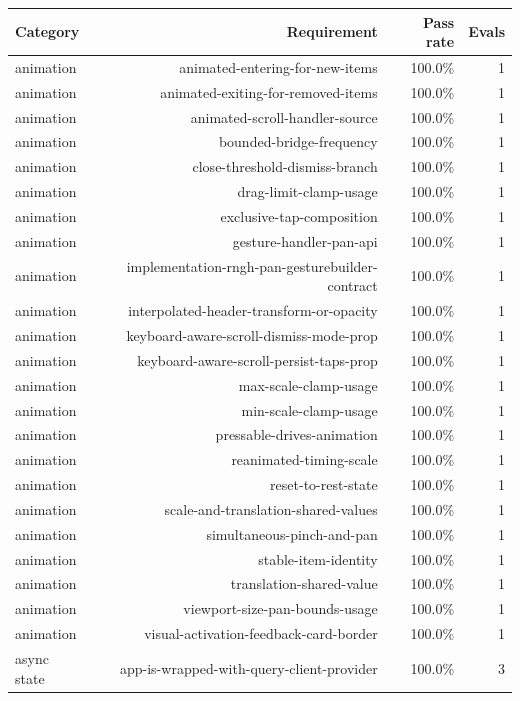 \begin{table}[htbp]
\centering
\begin{tabular}{lrrr}
\toprule
Category & Requirement & Pass rate & Evals \\
\midrule
animation & animated-entering-for-new-items & 100.0\% & 1 \\
animation & animated-exiting-for-removed-items & 100.0\% & 1 \\
animation & animated-scroll-handler-source & 100.0\% & 1 \\
animation & bounded-bridge-frequency & 100.0\% & 1 \\
animation & close-threshold-dismiss-branch & 100.0\% & 1 \\
animation & drag-limit-clamp-usage & 100.0\% & 1 \\
animation & exclusive-tap-composition & 100.0\% & 1 \\
animation & gesture-handler-pan-api & 100.0\% & 1 \\
animation & implementation-rngh-pan-gesturebuilder-contract & 100.0\% & 1 \\
animation & interpolated-header-transform-or-opacity & 100.0\% & 1 \\
animation & keyboard-aware-scroll-dismiss-mode-prop & 100.0\% & 1 \\
animation & keyboard-aware-scroll-persist-taps-prop & 100.0\% & 1 \\
animation & max-scale-clamp-usage & 100.0\% & 1 \\
animation & min-scale-clamp-usage & 100.0\% & 1 \\
animation & pressable-drives-animation & 100.0\% & 1 \\
animation & reanimated-timing-scale & 100.0\% & 1 \\
animation & reset-to-rest-state & 100.0\% & 1 \\
animation & scale-and-translation-shared-values & 100.0\% & 1 \\
animation & simultaneous-pinch-and-pan & 100.0\% & 1 \\
animation & stable-item-identity & 100.0\% & 1 \\
animation & translation-shared-value & 100.0\% & 1 \\
animation & viewport-size-pan-bounds-usage & 100.0\% & 1 \\
animation & visual-activation-feedback-card-border & 100.0\% & 1 \\
async state & app-is-wrapped-with-query-client-provider & 100.0\% & 3 \\

\end{tabular}
\end{table}
